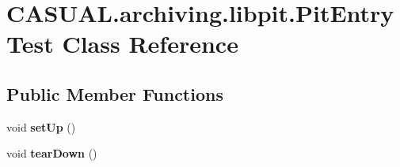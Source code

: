 \hypertarget{classCASUAL_1_1archiving_1_1libpit_1_1PitEntryTest}{\section{C\-A\-S\-U\-A\-L.\-archiving.\-libpit.\-Pit\-Entry\-Test Class Reference}
\label{classCASUAL_1_1archiving_1_1libpit_1_1PitEntryTest}
}
\subsection*{Public Member Functions}
\begin{DoxyCompactItemize}
\item 
\hypertarget{classCASUAL_1_1archiving_1_1libpit_1_1PitEntryTest_ac3552eee5a02ebb59a6fd296288c3075}{void {\bfseries set\-Up} ()}\label{classCASUAL_1_1archiving_1_1libpit_1_1PitEntryTest_ac3552eee5a02ebb59a6fd296288c3075}

\item 
\hypertarget{classCASUAL_1_1archiving_1_1libpit_1_1PitEntryTest_a61a321acfe86cca8e9704e5b23e69724}{void {\bfseries tear\-Down} ()}\label{classCASUAL_1_1archiving_1_1libpit_1_1PitEntryTest_a61a321acfe86cca8e9704e5b23e69724}


\end{DoxyCompactItemize}
